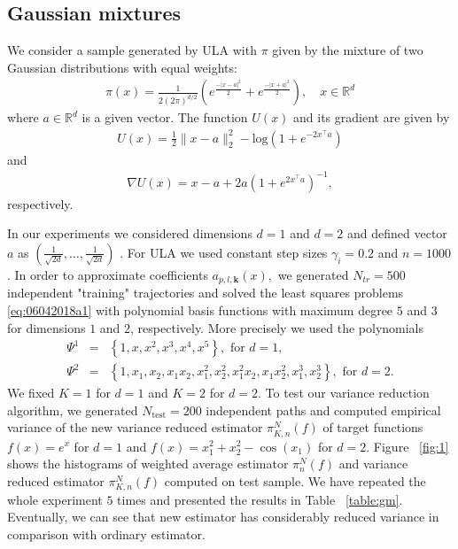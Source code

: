 \documentclass[article]{elsarticle}
\begin{document}
\subsection{Gaussian mixtures}
 We consider a sample generated by ULA with $\pi$  given by the mixture of two Gaussian distributions  with equal weights:
\begin{eqnarray*}
\pi (x) = \frac{1}{2(2\pi)^{d/2}} \left( e ^{\frac{-| x-a|^2}{2}}  + e ^{\frac{-| x+a|^2}{2}} \right), \quad x \in\mathbb R^d
\end{eqnarray*}
where $a \in \mathbb{R}^d$ is a given vector. The function $U(x)$ and its gradient are given by
\begin{eqnarray*}
U(x) = \frac{1}{2} \|x - a\|_2^2 - \text{log}(1 + e^{-2x^\top a})
\end{eqnarray*}
and
\begin{eqnarray*}
\nabla U(x) = x-a +2a(1 + e^{2 x^\top a})^{-1},
\end{eqnarray*}
respectively.
\par
In our experiments we considered dimensions $d = 1$ and $d = 2$ and defined vector $a$ as $(\frac{1}{\sqrt{2d}}, \dots, \frac{1}{\sqrt{2d}})$ . For ULA  we used constant step sizes $\gamma_i = 0.2$ and $n=1000$. In order to approximate coefficients $a_{p,l,\mathbf{k}}(x),$ we generated $N_{tr} = 500$ independent "training" trajectories and solved the least squares  problems \eqref{eq:06042018a1} with polynomial basis functions with maximum degree \(5\) and \(3\) for dimensions \(1\) and \(2\), respectively. More precisely we used the polynomials
\begin{eqnarray*}
\Psi^1 &=& \left\{1,x,x^2,x^3,x^4,x^5 \right\}, \text{ for } d = 1, \\
\Psi^2 &=& \left\{1,x_1,x_2,x_1 x_2,x_1^2,x_2^2, x_1^2 x_2,x_1x_2^2,x_1^3,x_2^3 \right\}, \text{ for }  d = 2.
\end{eqnarray*}
We fixed \(K = 1\) for \(d=1\) and \(K=2\) for \(d = 2\). To test our variance reduction algorithm, we generated $N_{\mathrm{test}} = 200$ independent paths and computed empirical variance of the new variance reduced estimator $\pi_{K,n}^N(f)$ of target functions $f(x) = e^x$ for $d = 1$ and $f(x) = x_1^2 + x_2^2 - \cos(x_1)$ for $d = 2$.
Figure ~\ref{fig:1} shows the histograms of weighted average estimator \(\pi_{n}^N(f)\) and variance reduced estimator \(\pi_{K,n}^N(f)\) computed on test sample. We have repeated the whole experiment \(5\) times and presented the results in Table ~\ref{table:gm}. Eventually, we can see that new estimator has considerably reduced variance in comparison with ordinary estimator.
\end{document}
